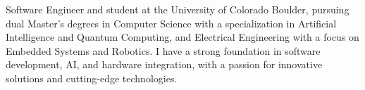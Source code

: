 

\begin{cvparagraph}

Software Engineer and student at the University of Colorado Boulder, pursuing dual Master’s degrees in Computer Science with a specialization in Artificial Intelligence and Quantum Computing, and Electrical Engineering with a focus on Embedded Systems and Robotics. I have a strong foundation in software development, AI, and hardware integration, with a passion for innovative solutions and cutting-edge technologies.
\end{cvparagraph}

